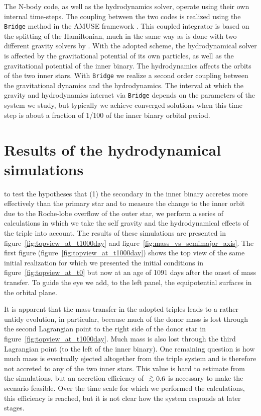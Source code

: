 \documentclass{aastex62}
\def\apgt{\ {\raise-.5ex\hbox{$\buildrel>\over\sim$}}\ }
\begin{document}
The N-body code, as well as the hydrodynamics solver, operate using
their own internal time-steps. The coupling between the two codes is
realized using the \texttt{Bridge} method in the AMUSE framework
\citep[see Sect.\.4.3.1 in][]{2013CoPhC.183..456P}.  This coupled
integrator is based on the splitting of the Hamiltonian, much in the
same way as is done with two different gravity solvers by
\cite{2007PASJ...59.1095F}. With the adopted scheme, the
hydrodynamical solver is affected by the gravitational potential of
its own particles, as well as the gravitational potential of the inner
binary. The hydrodynamics affects the orbits of the two inner stars. With
\texttt{Bridge} we realize a second order coupling between the
gravitational dynamics and the hydrodynamics.  The interval at which
the gravity and hydrodynamics interact via \texttt{Bridge} depends on
the parameters of the system we study, but typically we achieve
converged solutions when this time step is about a fraction of 1/100
of the inner binary orbital period.

\section{Results of the hydrodynamical simulations} \label{results}

to test the hypotheses that (1) the secondary in the inner binary
accretes more effectively than the primary star and to measure the
change to the inner orbit due to the Roche-lobe overflow of the outer
star, we perform a series of calculations in which we take the self
gravity and the hydrodynamical effects of the triple into account.
The results of these simulations are presented in
figure~\ref{fig:topview_at_t1000day} and
figure~\ref{fig:mass_vs_semimajor_axis}.  The first figure
(figure~\ref{fig:topview_at_t1000day}) shows the top view of the same
initial realization for which we presented the initial conditions in
figure~\ref{fig:topview_at_t0} but now at an age of 1091 days after
the onset of mass transfer. To guide the eye we add, to the left panel,
the equipotential surfaces in the orbital plane.

It is apparent that the mass transfer in the adopted triples leads to
a rather untidy evolution, in particular, because much of the donor
mass is lost through the second Lagrangian point to the right side of
the donor star in figure~\ref{fig:topview_at_t1000day}. Much mass is
also lost through the third Lagrangian point (to the left of the inner
binary). One remaining question is how much mass is eventually ejected
altogether from the triple system and is therefore not accreted to any
of the two inner stars. This value is hard to estimate from the
simulations, but an accretion efficiency of $\apgt 0.6$ is necessary to
make the scenario feasible. Over the time scale for which we performed
the calculations, this efficiency is reached, but it is not clear how
the system responds at later stages.
\end{document}
